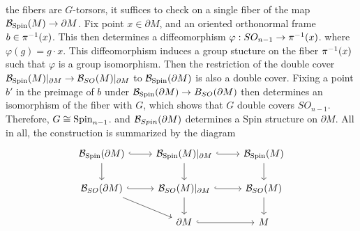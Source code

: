 the fibers are $G$-torsors, it suffices to check on a single fiber of the map
$\mathcal{B}_{\mathrm{Spin}}(M) \to \partial M$. Fix point $x \in \partial M$, and an
oriented orthonormal frame $b \in \pi^{-1}(x)$. This then determines a diffeomorphism
$\varphi : SO_{n-1} \to \pi^{-1}(x)$. where $\varphi(g) = g \cdot x$. This
diffeomorphism induces a group stucture on the fiber $\pi^{-1}(x)$ such
that $\varphi$ is a group isomorphism. Then the restriction of the double cover
$\mathcal{B}_{\mathrm{Spin}}(M)\vert_{\partial M} \to \mathcal{B}_{SO}(M)\vert_{\partial M}$ to
$\mathcal{B}_{\mathrm{Spin}}(\partial M)$ is also a double cover. Fixing a point $b'$ in the
preimage of $b$ under $\mathcal{B}_{\mathrm{Spin}}(\partial M) \to B_{SO}(\partial M)$ then
determines an isomorphism of the fiber with $G$, which shows that $G$ double
covers $SO_{n-1}$. Therefore, $G \cong \mathrm{Spin}_{n-1}$. and $\mathcal{B}_{Spin}(\partial M)$
determines a Spin structure on $\partial M$. All in all, the construction
is summarized by the diagram
\[\begin{tikzcd}
\B_{\Spin}(\partial M) \ar[d] \ar[r, hookrightarrow] & \B_{\Spin}(M)\vert_{\partial M}
\ar[r, hookrightarrow]\ar[d] & \B_{\Spin}(M) \ar[d] \\
\B_{SO}(\partial M) \ar[r, hookrightarrow] \ar[dr] &\B_{SO}(M)\vert_{\partial M}
\ar[d] \ar[r, hookrightarrow] & \B_{SO}(M) \ar[d] \\
&\partial M \ar[r, hookrightarrow] & M
\end{tikzcd}\]
%
